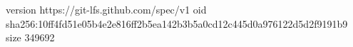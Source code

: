 version https://git-lfs.github.com/spec/v1
oid sha256:10ff4fd51e05b4e2e816ff2b5ea142b3b5a0cd12c445d0a976122d5d2f9191b9
size 349692
